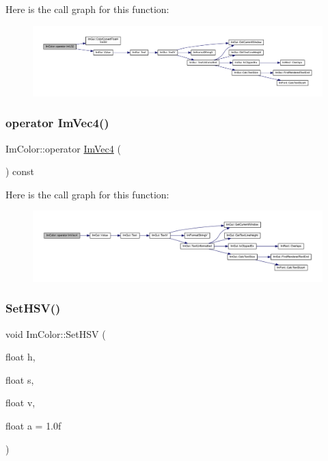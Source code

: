 Here is the call graph for this function\+:
\nopagebreak
\begin{figure}[H]
\begin{center}
\leavevmode
\includegraphics[width=350pt]{struct_im_color_a4f4fc53e0676d50404d6d5ffcf16637f_cgraph}
\end{center}
\end{figure}
\mbox{\label{struct_im_color_a10f1de242f13c93f8be64545e4cbcb0a}} 
\subsubsection{\texorpdfstring{operator Im\+Vec4()}{operator ImVec4()}}
{\footnotesize\ttfamily Im\+Color\+::operator \mbox{\hyperlink{struct_im_vec4}{Im\+Vec4}} (\begin{DoxyParamCaption}{ }\end{DoxyParamCaption}) const\hspace{0.3cm}{\ttfamily [inline]}}

Here is the call graph for this function\+:
\nopagebreak
\begin{figure}[H]
\begin{center}
\leavevmode
\includegraphics[width=350pt]{struct_im_color_a10f1de242f13c93f8be64545e4cbcb0a_cgraph}
\end{center}
\end{figure}
\mbox{\label{struct_im_color_afcff20160db703b956d56e5a9fa88e24}} 
\subsubsection{\texorpdfstring{Set\+H\+S\+V()}{SetHSV()}}
{\footnotesize\ttfamily void Im\+Color\+::\+Set\+H\+SV (\begin{DoxyParamCaption}\item[{float}]{h,  }\item[{float}]{s,  }\item[{float}]{v,  }\item[{float}]{a = {\ttfamily 1.0f} }\end{DoxyParamCaption})\hspace{0.3cm}{\ttfamily [inline]}}

